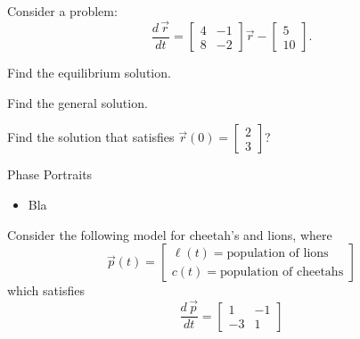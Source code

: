 \bookonlynewpage


\question
Consider a problem:
$$
\frac{d \,\vec{r}}{dt} = \begin{bmatrix} 4 & -1 \\ 8 & -2\end{bmatrix} \vec{r} - \begin{bmatrix} 5 \\ 10 \end{bmatrix}.
$$
\begin{parts}
	\item Find the equilibrium solution.
	\item Find the general solution.
	\item Find the solution that satisfies $\vec{r}(0) = \begin{bmatrix} 2 \\ 3\end{bmatrix}$?
\end{parts}








%
%



\begin{module}{Phase Portraits}
	\label{sys:phase}

	
	
\end{module}



\begin{lesson}

	\begin{itemize}
		\item Bla
	\end{itemize}
	

\end{lesson}




\newpage

\question
	Consider the following model for cheetah's and lions, where
	$$ \vec{p}(t) = \begin{bmatrix} \ell(t) = \text{population of lions} \\ c(t) = \text{population of cheetahs} \end{bmatrix} $$
	which satisfies
	$$
	\frac{d\,\vec{p}}{dt} = \begin{bmatrix}
 		1 & -1 \\
 		-3 & 1
 	\end{bmatrix}
	$$
	

